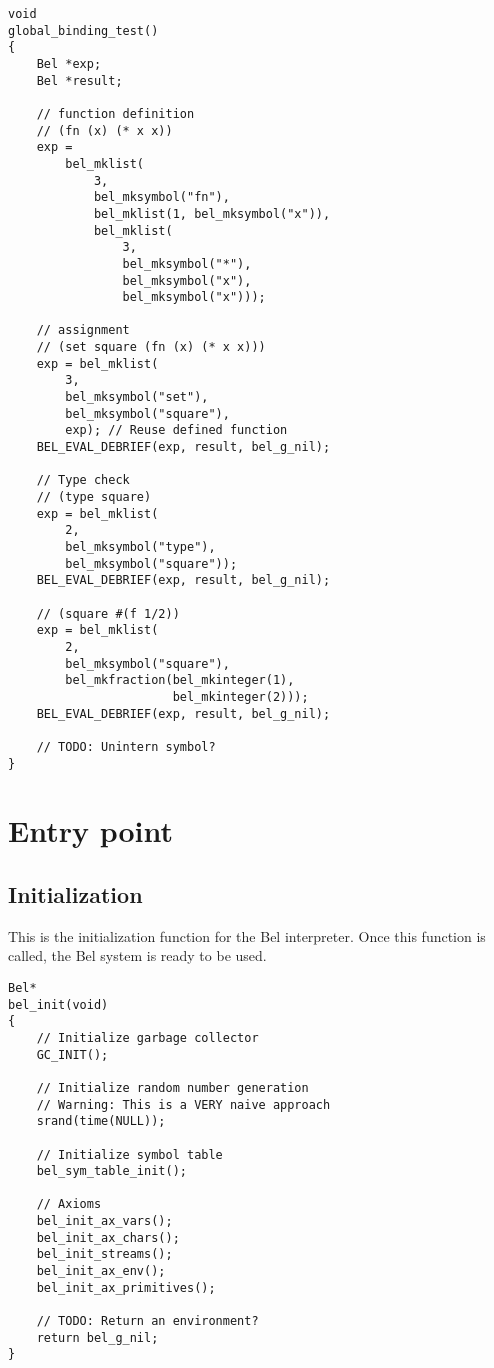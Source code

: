 \documentclass[openright,a4paper,twoside,12pt]{memoir}
\begin{document}
\begin{verbatim}
void
global_binding_test()
{
    Bel *exp;
    Bel *result;

    // function definition
    // (fn (x) (* x x))
    exp =
        bel_mklist(
            3,
            bel_mksymbol("fn"),
            bel_mklist(1, bel_mksymbol("x")),
            bel_mklist(
                3,
                bel_mksymbol("*"),
                bel_mksymbol("x"),
                bel_mksymbol("x")));
    
    // assignment
    // (set square (fn (x) (* x x)))
    exp = bel_mklist(
        3,
        bel_mksymbol("set"),
        bel_mksymbol("square"),
        exp); // Reuse defined function
    BEL_EVAL_DEBRIEF(exp, result, bel_g_nil);

    // Type check
    // (type square)
    exp = bel_mklist(
        2,
        bel_mksymbol("type"),
        bel_mksymbol("square"));
    BEL_EVAL_DEBRIEF(exp, result, bel_g_nil);
    
    // (square #(f 1/2))
    exp = bel_mklist(
        2,
        bel_mksymbol("square"),
        bel_mkfraction(bel_mkinteger(1),
                       bel_mkinteger(2)));
    BEL_EVAL_DEBRIEF(exp, result, bel_g_nil);

    // TODO: Unintern symbol?
}
\end{verbatim}

\chapter{Entry point}
\label{sec:orgc964476}
\section{Initialization}
\label{sec:orgbbc0b8b}

This is the initialization function for the Bel interpreter. Once this
function is called, the Bel system is ready to be used.

\begin{verbatim}
Bel*
bel_init(void)
{
    // Initialize garbage collector
    GC_INIT();

    // Initialize random number generation
    // Warning: This is a VERY naive approach
    srand(time(NULL));

    // Initialize symbol table
    bel_sym_table_init();

    // Axioms
    bel_init_ax_vars();
    bel_init_ax_chars();
    bel_init_streams();
    bel_init_ax_env();
    bel_init_ax_primitives();

    // TODO: Return an environment?
    return bel_g_nil;
}
\end{verbatim}
\end{document}
